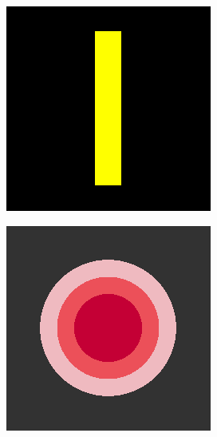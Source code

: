 \begin{figure}[H]
    \centering
    \begin{subfigure}{0.4\linewidth}
        \centering
        \includegraphics[width=0.8\linewidth]{image/image_inpaint_synthetic/case01-original.png}
    \end{subfigure}
    \begin{subfigure}{0.4\linewidth}
        \centering
        \includegraphics[width=0.8\linewidth]{image/image_inpaint_synthetic/case02-original.png}
    \end{subfigure}
    \bigskip
    \begin{subfigure}{0.4\linewidth}

\end{subfigure}
\end{figure}
